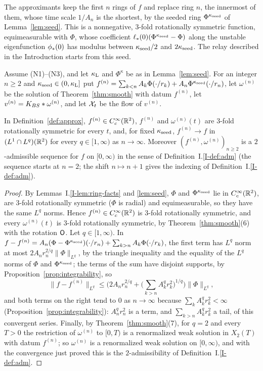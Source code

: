 The approximants keep the first $n$ rings of $f$ and replace ring $n$, the
innermost of them, whose time scale $1/A_n$ is the shortest, by the seeded ring
$\Phi^{\kappa_{\mathrm{seed}}}$ of Lemma~\ref{lem:seed}. This is a nonnegative, $3$-fold
rotationally symmetric function, equimeasurable with $\Phi$, whose coefficient
$\ell_*(0)(\Phi^{\kappa_{\mathrm{seed}}}-\Phi)$ along the unstable eigenfunction $\phi_*(0)$ has
modulus between $\kappa_{\mathrm{seed}}/2$ and $2\kappa_{\mathrm{seed}}$. The relay described in the
Introduction starts from this seed.

\begin{definition}
\label{def:approx}
Assume \textup{(N1)}--\textup{(N3)}, and let $\kappa_{\mathrm{L}}$ and $\Phi^\kappa$ be as in
Lemma~\ref{lem:seed}. For an integer $n\ge2$ and $\kappa_{\mathrm{seed}}\in(0,\kappa_{\mathrm{L}}]$ put
$f^{(n)}=\sum_{k<n}A_k\Phi(\cdot/r_k)+A_n\Phi^{\kappa_{\mathrm{seed}}}(\cdot/r_n)$, let $\omega^{(n)}$ be the solution of Theorem~\ref{thm:smooth} with datum
$f^{(n)}$, let $v^{(n)}=K_{BS}\ast\omega^{(n)}$, and let $\mathcal{X}_t$ be the flow of
$v^{(n)}$.
\end{definition}

\begin{lemma}
\label{lem:adm}
In Definition~\ref{def:approx}, $f^{(n)}\in C_c^\infty(\mathbb{R}^2)$,
$f^{(n)}$ and $\omega^{(n)}(t)$ are $3$-fold rotationally symmetric for every
$t$, and, for fixed $\kappa_{\mathrm{seed}}$, $f^{(n)}\to f$ in $(L^1\cap L^q)(\mathbb{R}^2)$ for every
$q\in[1,\infty)$ as $n\to\infty$. Moreover $(f^{(n)},\omega^{(n)})_{n\ge2}$ is a
$2$-admissible sequence for $f$ on $[0,\infty)$ in the sense of
Definition~I.\ref{I-def:adm} (the sequence starts at
$n=2$; the shift $n\mapsto n+1$ gives the indexing of Definition~I.\ref{I-def:adm}).
\end{lemma}
\begin{proof}
By Lemmas~I.\ref{I-lem:ring-facts} and \ref{lem:seed}, $\Phi$ and $\Phi^{\kappa_{\mathrm{seed}}}$ lie
in $C_c^\infty(\mathbb{R}^2)$, are $3$-fold rotationally symmetric ($\Phi$ is radial)
and equimeasurable, so
they have the same $L^q$ norms. Hence $f^{(n)}\in C_c^\infty(\mathbb{R}^2)$ is
$3$-fold rotationally symmetric, and every $\omega^{(n)}(t)$ is $3$-fold
rotationally symmetric, by Theorem~\ref{thm:smooth}\textup{(6)} with the rotation $\mathsf{O}$. Let
$q\in[1,\infty)$. In
$f-f^{(n)}=A_n(\Phi-\Phi^{\kappa_{\mathrm{seed}}})(\cdot/r_n)+\sum_{k>n}A_k\Phi(\cdot/r_k)$, the
first term has $L^q$ norm at most $2A_nr_n^{2/q}\|\Phi\|_{L^q}$, by the triangle
inequality and the equality of the $L^q$ norms of $\Phi$ and $\Phi^{\kappa_{\mathrm{seed}}}$; the
terms of the sum have disjoint supports, by Proposition~\ref{prop:integrability}, so
\[
\|f-f^{(n)}\|_{L^q}\le\Big(2A_nr_n^{2/q}
+\Big(\sum_{k>n}A_k^qr_k^2\Big)^{1/q}\Big)\|\Phi\|_{L^q},
\]
and both terms on the right tend to $0$ as $n\to\infty$ because
$\sum_kA_k^qr_k^2<\infty$ (Proposition~\ref{prop:integrability}): $A_n^qr_n^2$ is
a term, and $\sum_{k>n}A_k^qr_k^2$ a tail, of this convergent series. Finally, by
Theorem~\ref{thm:smooth}\textup{(7)}, for $q=2$ and every
$T>0$ the restriction of $\omega^{(n)}$ to $[0,T)$ is a renormalized weak
solution in $X_2(T)$ with datum $f^{(n)}$; so $\omega^{(n)}$ is a renormalized
weak solution on $[0,\infty)$, and with the convergence just proved this is the
$2$-admissibility of Definition~I.\ref{I-def:adm}.
\end{proof}

